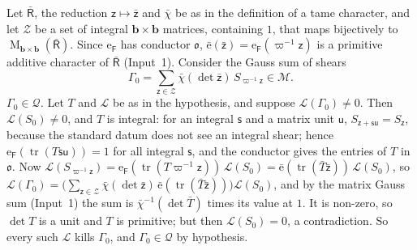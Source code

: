 \documentclass[11pt,a4paper]{article}
\makeatletter
\theoremstyle{plainx}
\theoremstyle{uprightx}
\renewenvironment{proof}[1][Proof]{\par\pushQED{\qed}\normalfont\topsep0pt\partopsep0pt
  \trivlist\item[\hskip\labelsep\itshape #1.]\ignorespaces}{\popQED\endtrivlist\@endpefalse}
\newcommand{\sF}{\mathsf{F}}
\newcommand{\sO}{\mathfrak{o}}
\newcommand{\sR}{\mathsf{R}}
\newcommand{\bb}{\mathbf{b}}
\newcommand{\sz}{\mathsf{z}}
\newcommand{\ssx}{\mathsf{s}}
\newcommand{\tr}{\operatorname{tr}}
\newcommand{\cM}{\mathcal{M}}
\newcommand{\cL}{\mathcal{L}}
\newcommand{\cP}{\mathcal{Q}}
\newcommand{\Mat}[2]{\operatorname{M}_{#1\times#2}}
\makeatother
\begin{document}
\begin{proof}
Let $\bar{\sR}$, the reduction $\sz\mapsto\bar{\sz}$ and $\bar\chi$ be as in the definition of a tame character, and
let $\mathcal{Z}$ be a set of integral $\bb\times\bb$ matrices, containing $1$, that maps bijectively to
$\Mat{\bb}{\bb}(\bar{\sR})$. Since $\mathrm{e}_{\sF}$ has conductor $\sO$,
$\bar{\mathrm{e}}(\bar{\sz})=\mathrm{e}_{\sF}(\varpi^{-1}\sz)$ is a primitive additive character of $\bar{\sR}$ (Input~1).
Consider the Gauss sum of shears
\[\Gamma_0=\sum_{\sz\in\mathcal{Z}}\bar\chi(\det\bar{\sz})\,S_{\varpi^{-1}\sz}\in\cM .\]
\emph{$\Gamma_0\in\cP$.} Let $T$ and $\cL$ be as in the hypothesis, and suppose $\cL(\Gamma_0)\ne0$. Then
$\cL(S_0)\ne0$, and $T$ is integral: for an integral $\ssx$ and a matrix unit $\mathsf{u}$,
$S_{\sz+\ssx\mathsf{u}}=S_{\sz}$, because the standard datum does not see an integral shear; hence
$\mathrm{e}_{\sF}(\tr(T\ssx\mathsf{u}))=1$ for all integral $\ssx$, and the conductor gives the entries of $T$ in
$\sO$. Now $\cL(S_{\varpi^{-1}\sz})=\mathrm{e}_{\sF}(\tr(T\varpi^{-1}\sz))\,\cL(S_0)=\bar{\mathrm{e}}(\tr(\bar T\bar{\sz}))\,\cL(S_0)$, so
$\cL(\Gamma_0)=\bigl(\sum_{\sz\in\mathcal{Z}}\bar\chi(\det\bar{\sz})\,\bar{\mathrm{e}}(\tr(\bar T\bar{\sz}))\bigr)\cL(S_0)$,
and by the matrix Gauss sum (Input~1) the sum is $\bar\chi^{-1}(\det\bar T)$ times its value at $1$. It is
non-zero, so $\det T$ is a unit and $T$ is primitive; but then $\cL(S_0)=0$, a contradiction. So every such $\cL$
kills $\Gamma_0$, and $\Gamma_0\in\cP$ by hypothesis.


\end{proof}
\end{document}
